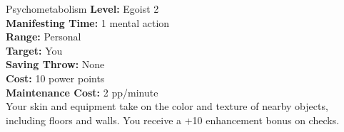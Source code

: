 {Psychometabolism}
{
	\textbf{Level:}
	Egoist 2\\
	\textbf{Manifesting Time:}
	1 mental action\\
	\textbf{Range:}
	Personal\\
	\textbf{Target:}
	You\\
	\textbf{Saving Throw:}
	None\\
	\textbf{Cost:}
	10 power points\\
	\textbf{Maintenance Cost:}
	2 pp/minute\\
}
{
	Your skin and equipment take on the color and texture of nearby objects, including floors and walls. You receive a +10 enhancement bonus on  checks.
}